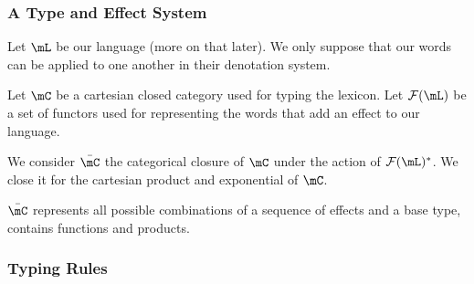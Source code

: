 \documentclass[math, english, info]{beamercours}
\begin{document}
\begin{frame}
	\frametitle{A Type and Effect System}
	Let $\mL$ be our language (more on that later).
	We only suppose that our words can be applied to one another in their
	denotation system.

	\pause

	Let $\mC$ be a cartesian closed category used for typing the lexicon.
	Let $\mathcal{F}(\mL)$ be a set of functors used for representing the words
	that add an effect to our language.

	\pause\smallskip

	We consider $\bar{\mC}$ the categorical closure of $\mC$ under the action
	of $\mathcal{F}(\mL)^{*}$.
	We close it for the cartesian product and exponential of $\mC$.

	$\bar{\mC}$ represents all possible combinations of a sequence of effects
	and a base type, contains functions and products.
\end{frame}

\begin{frame}[fragile]
	\frametitle{Typing Rules}
\end{frame}
\end{document}
